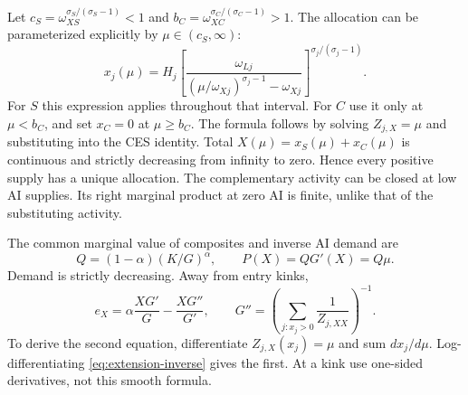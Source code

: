 \documentclass[11pt]{article}
\begin{document}
Let $c_S=\omega_{XS}^{\sigma_S/(\sigma_S-1)}<1$ and
$b_C=\omega_{XC}^{\sigma_C/(\sigma_C-1)}>1$.
The allocation can be parameterized explicitly by $\mu\in(c_S,\infty)$:
\begin{equation}
 x_j(\mu)=H_j
 \left[\frac{\omega_{Lj}}
 {(\mu/\omega_{Xj})^{\sigma_j-1}-\omega_{Xj}}\right]^{\sigma_j/(\sigma_j-1)}.
 \label{eq:extension-sector-demand}
\end{equation}
For $S$ this expression applies throughout that interval.
For $C$ use it only at $\mu<b_C$, and set $x_C=0$ at $\mu\geq b_C$.
The formula follows by solving $Z_{j,X}=\mu$ and substituting into the
CES identity. Total $X(\mu)=x_S(\mu)+x_C(\mu)$ is continuous and
strictly decreasing from infinity to zero. Hence every positive supply
has a unique allocation. The complementary activity can be closed at low
AI supplies. Its right marginal product at zero AI is finite, unlike that
of the substituting activity.

The common marginal value of composites and inverse AI demand are
\begin{equation}
 Q=(1-\alpha)(K/G)^\alpha,\qquad P(X)=QG'(X)=Q\mu.
 \label{eq:extension-inverse}
\end{equation}
Demand is strictly decreasing. Away from entry kinks,
\begin{equation}
 e_X=\alpha\frac{XG'}G-\frac{XG''}{G'},\qquad
 G''=\left(\sum_{j:x_j>0}\frac1{Z_{j,XX}}\right)^{-1}.
 \label{eq:extension-elasticity}
\end{equation}
To derive the second equation, differentiate $Z_{j,X}(x_j)=\mu$ and
sum $dx_j/d\mu$. Log-differentiating \eqref{eq:extension-inverse} gives
the first. At a kink use one-sided derivatives, not this smooth formula.
\end{document}
